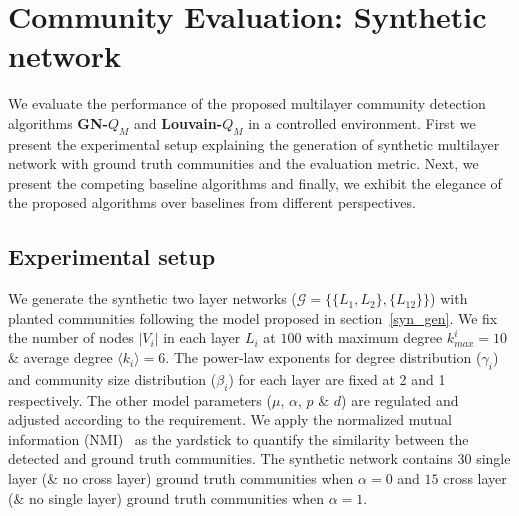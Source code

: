 \section{Community Evaluation: Synthetic network}
\label{eval}
We evaluate the performance of the proposed multilayer community detection algorithms \textbf{GN-$Q_M$} and \textbf{Louvain-$Q_M$} in a
controlled environment. First we present the experimental setup explaining the generation of synthetic multilayer network
with ground truth communities and the evaluation metric. Next, we present the competing baseline algorithms and
finally, we exhibit the elegance of the proposed algorithms over baselines from different perspectives.

\subsection{Experimental setup}
We generate the synthetic two layer networks ($\mathcal{G} = \{\{L_1, L_2\}, \{L_{12}\}\}$) with planted communities
following the model proposed in section~\ref{syn_gen}.
We fix the number of nodes $|V_i|$ in each layer $L_i$ at $100$ with maximum degree $k^{i}_{max}=10$ \& average
degree $\langle k_i\rangle=6$. The power-law exponents for degree distribution ($\gamma_i$) and community size distribution ($\beta_i$)
for each layer are fixed at 2 and 1 respectively.
The other model parameters ($\mu$, $\alpha$, $p$ \& $d$) are regulated and adjusted according to the requirement.
We apply the normalized mutual information (NMI)~\cite{danon2005comparing} as the yardstick
to quantify the similarity between the detected and ground truth communities.
%
%
The synthetic network contains $30$
single layer (\& no cross layer) ground truth communities when $\alpha = 0$ and $15$
cross layer (\& no single layer) ground truth communities when $\alpha = 1$.

